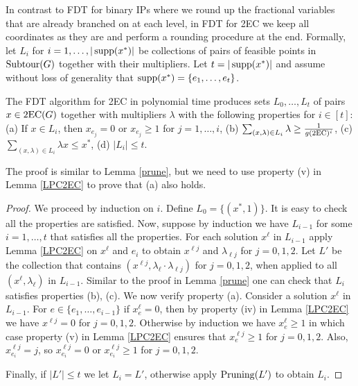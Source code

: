 In contrast to FDT for binary IPs where we round up the fractional variables that are already branched on at each level, in FDT for 2EC we keep all coordinates as they are and perform a rounding procedure at the end. Formally, let $L_i$ for $i=1,\ldots,|\operatorname{supp}(x^*)|$ be collections of pairs of feasible points in $\operatorname{{Subtour}}(G)$ together with their multipliers. Let $t=|\operatorname{supp}(x^*)|$ and assume without loss of generality that $\operatorname{supp}(x^*)=\{e_1,\ldots,e_t\}$. 

\begin{lemma}\label{2ecpruning}
	The FDT algorithm for 2EC in  polynomial time produces sets $L_0,\ldots,L_t$ of pairs $x\in \2ec(G)$ together with multipliers $\lambda$ with the following properties for $i\in [t]$:
	(a) If $x\in L_i$, then $x_{e_j}=0$ or $x_{e_j}\geq 1$ for $j=1,\ldots,i$, (b) $\sum_{(x,\lambda)\in L_i }\lambda \geq \frac{1}{g(\2ec)^i}$, (c) $\sum_{(x,\lambda)\in L_i }\lambda x \leq x^*$, (d) $|L_i|\leq t$.
\end{lemma}
The proof is similar to Lemma \ref{prune}, but we need to use property (v) in Lemma \ref{LPC2EC} to prove that (a) also holds.
\begin{proof}
	We proceed by induction on $i$. Define $L_0=\{(x^*,1)\}$. It is easy to check all the properties are satisfied. Now, suppose by induction we have $L_{i-1}$ for some $i=1,\ldots,t$ that satisfies all the properties. For each solution $x^\ell$ in $L_{i-1}$ apply Lemma \ref{LPC2EC} on $x^\ell$ and $e_{i}$ to obtain $x^{\ell j}$ and $\lambda_{\ell j}$ for $j=0,1,2$. Let $L'$ be the collection that contains $(x^{\ell j},\lambda_\ell \cdot \lambda_{\ell j})$ for $j=0,1,2$, when applied to all $(x^\ell,\lambda_\ell)$ in $L_{i-1}$. Similar to the proof in Lemma \ref{prune} one can check that $L_i$ satisfies properties (b), (c). We now verify property (a). Consider a solution $x^\ell$ in $L_{i-1}$. For $e\in \{e_1,\ldots,e_{i-1}\}$ if $x^\ell_e =0$, then by property (iv) in Lemma \ref{LPC2EC} we have $x^{\ell j}=0$ for $j=0,1,2$. Otherwise by induction we have $x^{\ell}_{e}\geq 1$ in which case property (v) in Lemma \ref{LPC2EC} ensures that $x^{\ell j}_e\geq 1$ for $j=0,1,2$. Also, $x^{\ell j}_{e_i}= j$, so $x^{\ell j}_{e_i}=0$ or $x^{\ell j}_{e_i}\geq 1$ for $j=0,1,2$. 
	
	Finally, if $|L'|\leq t$ we let $L_i=L'$, otherwise apply $\operatorname{{{Pruning}}}(L')$ to obtain $L_{i}$.
\end{proof}

